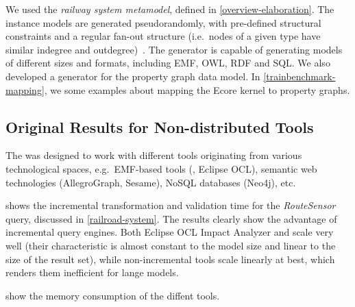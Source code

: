 We used  the \emph{railway system metamodel}, defined in \autoref{overview-elaboration}. The instance models are generated pseudorandomly, with pre-defined structural constraints and a regular fan-out structure (i.e.\ nodes of a given type have similar indegree and outdegree)~\cite{ASE2013}. The generator is capable of generating models of different sizes and formats, including EMF, OWL, RDF and SQL. We also developed a generator for the property graph data model. In \autoref{trainbenchmark-mapping}, we some examples about mapping the Ecore kernel to property graphs.

\subsection{Original Results for Non-distributed Tools}


The \tb{} was designed to work with different tools originating from various technological spaces, e.g.\ EMF-based tools (\eiq{}, Eclipse OCL), semantic web technologies (AllegroGraph, Sesame), NoSQL databases (Neo4j), etc.

 shows the incremental transformation and validation time for the \emph{RouteSensor} query, discussed in \autoref{railroad-system}. The results clearly show the advantage of incremental query engines. Both Eclipse OCL Impact Analyzer and \eiq{} scale very well (their characteristic is almost constant to the model size and linear to the size of the result set), while non-incremental tools scale linearly at best, which renders them inefficient for lange models.



 show the memory consumption of the diffent tools.




